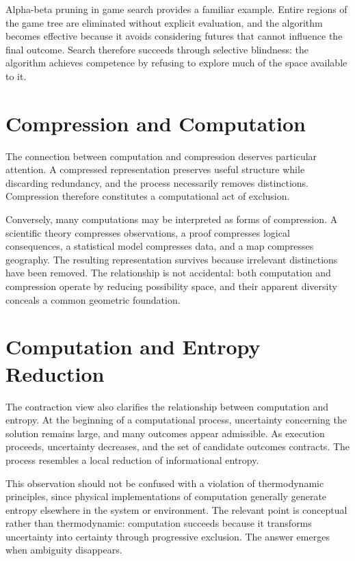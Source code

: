 \documentclass[11pt,oneside]{book}
\theoremstyle{plain}
\theoremstyle{definition}
\theoremstyle{remark}
\begin{document}
Alpha-beta pruning in game search provides a familiar example. Entire regions of the game tree are eliminated without explicit evaluation, and the algorithm becomes effective because it avoids considering futures that cannot influence the final outcome. Search therefore succeeds through selective blindness: the algorithm achieves competence by refusing to explore much of the space available to it.

\section{Compression and Computation}

The connection between computation and compression deserves particular attention. A compressed representation preserves useful structure while discarding redundancy, and the process necessarily removes distinctions. Compression therefore constitutes a computational act of exclusion.

Conversely, many computations may be interpreted as forms of compression. A scientific theory compresses observations, a proof compresses logical consequences, a statistical model compresses data, and a map compresses geography. The resulting representation survives because irrelevant distinctions have been removed. The relationship is not accidental: both computation and compression operate by reducing possibility space, and their apparent diversity conceals a common geometric foundation.

\section{Computation and Entropy Reduction}

The contraction view also clarifies the relationship between computation and entropy. At the beginning of a computational process, uncertainty concerning the solution remains large, and many outcomes appear admissible. As execution proceeds, uncertainty decreases, and the set of candidate outcomes contracts. The process resembles a local reduction of informational entropy.

This observation should not be confused with a violation of thermodynamic principles, since physical implementations of computation generally generate entropy elsewhere in the system or environment. The relevant point is conceptual rather than thermodynamic: computation succeeds because it transforms uncertainty into certainty through progressive exclusion. The answer emerges when ambiguity disappears.
\end{document}
